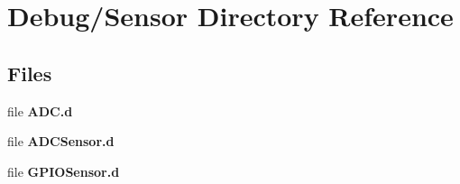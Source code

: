 \section{Debug/\+Sensor Directory Reference}
\label{dir_f773732357734eeec2cf57ee2ad4e152}
\subsection*{Files}
\begin{DoxyCompactItemize}
\item 
file {\bfseries A\+D\+C.\+d}
\item 
file {\bfseries A\+D\+C\+Sensor.\+d}
\item 
file {\bfseries G\+P\+I\+O\+Sensor.\+d}
\end{DoxyCompactItemize}
